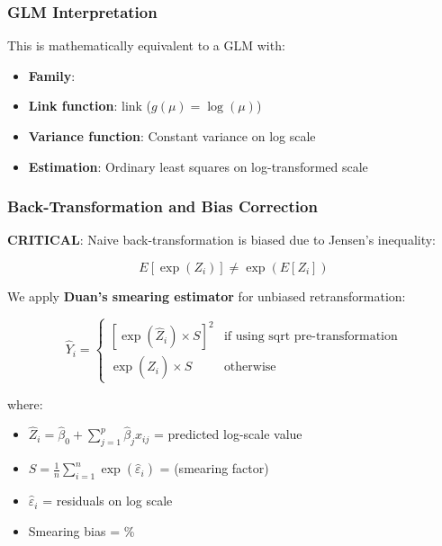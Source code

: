 \subsubsection{GLM Interpretation}

This is mathematically equivalent to a GLM with:
\begin{itemize}
    \item \textbf{Family}: \ModelSixDistribution{}
    \item \textbf{Link function}: \ModelSixLinkFunction{} link ($g(\mu) = \log(\mu)$)
    \item \textbf{Variance function}: Constant variance on log scale
    \item \textbf{Estimation}: Ordinary least squares on log-transformed scale
\end{itemize}

\subsubsection{Back-Transformation and Bias Correction}

\textbf{CRITICAL}: Naive back-transformation is biased due to Jensen's inequality:

\begin{equation}
E[\exp(Z_i)] \neq \exp(E[Z_i])
\end{equation}

We apply \textbf{Duan's smearing estimator} for unbiased retransformation:

\begin{equation}
\hat{Y}_i = 
\begin{cases}
\left[\exp(\hat{Z}_i) \times S\right]^2 & \text{if using sqrt pre-transformation} \\
\exp(\hat{Z}_i) \times S & \text{otherwise}
\end{cases}
\end{equation}

where:
\begin{itemize}
    \item $\hat{Z}_i = \hat{\beta}_0 + \sum_{j=1}^{p} \hat{\beta}_j x_{ij}$ = predicted log-scale value
    \item $S = \frac{1}{n}\sum_{i=1}^{n}\exp(\hat{\varepsilon}_i)$ = \ModelSixSmearingFactor{} (smearing factor)
    \item $\hat{\varepsilon}_i$ = residuals on log scale
    \item Smearing bias = \ModelSixSmearingBias{}\%
\end{itemize}

